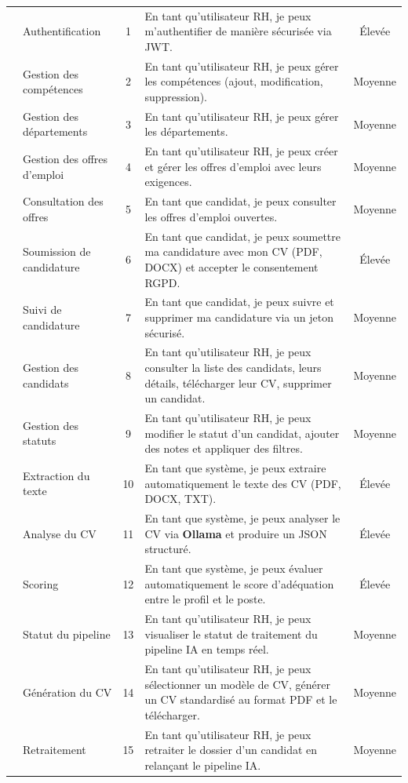 \documentclass[12pt,a4paper,oneside]{report}
\begin{document}
\begin{itemize}
\begin{small}
\begin{xltabular}{\textwidth}{|>{\centering\arraybackslash}m{2cm}|>{\centering\arraybackslash}p{2.5cm}|c|X|c|}
& Authentification & 1 & En tant qu'utilisateur RH, je peux m'authentifier de manière sécurisée via JWT. & Élevée \\ 
& Gestion des compétences & 2 & En tant qu'utilisateur RH, je peux gérer les compétences (ajout, modification, suppression). & Moyenne \\ 
& Gestion des départements & 3 & En tant qu'utilisateur RH, je peux gérer les départements. & Moyenne \\ 
& Gestion des offres d'emploi & 4 & En tant qu'utilisateur RH, je peux créer et gérer les offres d'emploi avec leurs exigences. & Moyenne \\ \hline

& Consultation des offres & 5 & En tant que candidat, je peux consulter les offres d'emploi ouvertes. & Moyenne \\ 
& Soumission de candidature & 6 & En tant que candidat, je peux soumettre ma candidature avec mon CV (PDF, DOCX) et accepter le consentement RGPD. & Élevée \\ 
& Suivi de candidature & 7 & En tant que candidat, je peux suivre et supprimer ma candidature via un jeton sécurisé. & Moyenne \\ 
& Gestion des candidats & 8 & En tant qu'utilisateur RH, je peux consulter la liste des candidats, leurs détails, télécharger leur CV, supprimer un candidat. & Moyenne \\ 
& Gestion des statuts & 9 & En tant qu'utilisateur RH, je peux modifier le statut d'un candidat, ajouter des notes et appliquer des filtres. & Moyenne \\ \hline

& Extraction du texte & 10 & En tant que système, je peux extraire automatiquement le texte des CV (PDF, DOCX, TXT). & Élevée \\ 
& Analyse du CV & 11 & En tant que système, je peux analyser le CV via \textbf{Ollama} et produire un JSON structuré. & Élevée \\ 
& Scoring & 12 & En tant que système, je peux évaluer automatiquement le score d'adéquation entre le profil et le poste. & Élevée \\ 
& Statut du pipeline & 13 & En tant qu'utilisateur RH, je peux visualiser le statut de traitement du pipeline IA en temps réel. & Moyenne \\ 
& Génération du CV & 14 & En tant qu'utilisateur RH, je peux sélectionner un modèle de CV, générer un CV standardisé au format PDF et le télécharger. & Moyenne \\ 
& Retraitement & 15 & En tant qu'utilisateur RH, je peux retraiter le dossier d'un candidat en relançant le pipeline IA. & Moyenne \\ \hline


\end{xltabular}
\end{small}
\end{itemize}
\end{document}
